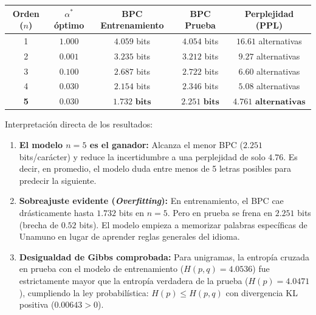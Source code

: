 \documentclass[11pt,letterpaper]{article}
\begin{document}
\begin{table}[H]
\centering
\small
\begin{tabular}{ccccc}
\toprule
\textbf{Orden ($n$)} & \textbf{$\alpha^*$ óptimo} & \textbf{BPC Entrenamiento} & \textbf{BPC Prueba} & \textbf{Perplejidad (PPL)} \\
\midrule
1 & $1.000$ & $4.059$ bits & $4.054$ bits & $16.61$ alternativas \\
2 & $0.001$ & $3.235$ bits & $3.212$ bits & $9.27$ alternativas \\
3 & $0.100$ & $2.687$ bits & $2.722$ bits & $6.60$ alternativas \\
4 & $0.030$ & $2.154$ bits & $2.346$ bits & $5.08$ alternativas \\
\textbf{5} & $\mathbf{0.030}$ & $\mathbf{1.732\text{ bits}}$ & $\mathbf{2.251\text{ bits}}$ & $\mathbf{4.761\text{ alternativas}}$ \\
\bottomrule
\end{tabular}
\end{table}

\begin{conceptbox}{Interpretación directa de los resultados:}
\begin{enumerate}[leftmargin=*, nosep]
    \item \textbf{El modelo $n=5$ es el ganador:} Alcanza el menor BPC ($2.251$ bits/carácter) y reduce la incertidumbre a una perplejidad de solo $4.76$. Es decir, en promedio, el modelo duda entre menos de 5 letras posibles para predecir la siguiente.
    \item \textbf{Sobreajuste evidente (\textit{Overfitting}):} En entrenamiento, el BPC cae drásticamente hasta $1.732$ bits en $n=5$. Pero en prueba se frena en $2.251$ bits (brecha de $0.52$ bits). El modelo empieza a memorizar palabras específicas de Unamuno en lugar de aprender reglas generales del idioma.
    \item \textbf{Desigualdad de Gibbs comprobada:} Para unigramas, la entropía cruzada en prueba con el modelo de entrenamiento ($H(p,q) = 4.0536$) fue estrictamente mayor que la entropía verdadera de la prueba ($H(p) = 4.0471$), cumpliendo la ley probabilística: $H(p) \le H(p,q)$ con divergencia KL positiva ($0.00643 > 0$).
\end{enumerate}
\end{conceptbox}
\end{document}
